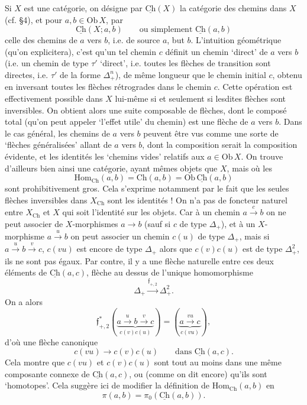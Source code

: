 \documentclass[11pt]{article}
\newcommand{\msp}[1]{\marginpar{\vspace*{10pt}\footnotesize [#1]}}
\newcommand{\Ch}{\underline{\mathrm{Ch}}}
\begin{document}
Si $X$ est une catégorie, on désigne par $\Ch(X)$ la catégorie des chemins dans $X$ (cf. §4), et pour $a,b \in \mathrm{Ob}\,X$, par
\[
\Ch(X;a,b) \qquad \text{ou simplement } \Ch(a,b)
\]
celle des chemins de $a$ vers $b$, i.e. de source $a$, but $b$. L'intuition géométrique (qu'on explicitera), c'est qu'un tel chemin $c$ définit un chemin `direct' de $a$ vers $b$ (i.e. un chemin de type $\tau'$ `direct', i.e. toutes les flèches de transition sont directes, i.e. $\tau'$ de la forme $\Delta_+^n$), de même longueur que le chemin initial $c$, obtenu en inversant toutes les flèches rétrogrades dans le chemin $c$. Cette opération est effectivement possible dans $X$ lui-même si et seulement si lesdites flèches sont inversibles. On obtient alors une suite composable de flèches, dont le composé total (qu'on peut appeler `l'effet utile' du chemin)
\msp{page 60}
est une flèche de $a$ vers $b$. Dans le cas général, les chemins de $a$ vers $b$ peuvent être vus comme une sorte de `flèches généralisées' allant de $a$ vers $b$, dont la composition serait la composition évidente, et les identités les `chemins vides' relatifs aux $a \in \mathrm{Ob}\,X$. On trouve d'ailleurs bien ainsi une catégorie, ayant mêmes objets que $X$, mais où les
\[
\mathrm{Hom}_{\mathrm{Ch}}(a,b) = \mathrm{Ch}(a,b) = \mathrm{Ob}\,\Ch(a,b)
\]
sont prohibitivement gros. Cela s'exprime notamment par le fait que les seules flèches inversibles dans $X_{\mathrm{Ch}}$ sont les identités ! On n'a pas de foncteur naturel entre $X_{\mathrm{Ch}}$ et $X$ qui soit l'identité sur les objets. Car à un chemin $a \xrightarrow{c} b$ on ne peut associer de $X$-morphismes $a \longrightarrow b$ (sauf si $c$ de type $\Delta_+$), et à un $X$-morphisme $a \xrightarrow{u} b$ on peut associer un chemin $c(u)$ de type $\Delta_+$, mais si $a \xrightarrow{u} b \xrightarrow{v} c$, $c(vu)$ est encore de type $\Delta_+$ alors que $c(v)c(u)$ est de type $\Delta_+^2$, ils ne sont pas égaux. Par contre, il y a une flèche naturelle entre ces deux éléments de $\Ch(a,c)$, flèche au dessus de l'unique homomorphisme
\[
\Delta_+ \xrightarrow{\mathfrak{f}_{+,2}} \Delta_+^2.
\]
\msp{page 61}
On a alors
\[
\mathfrak{f}_{+,2}^*(\underbrace{a \xrightarrow{u} b \xrightarrow{v} c}_{c(v)c(u)}) = (\underbrace{a \xrightarrow{vu} c}_{c(vu)}),
\]
d'où une flèche canonique
\[
c(vu) \longrightarrow c(v)c(u) \qquad \text{dans } \Ch(a,c).
\]
Cela montre que $c(vu)$ et $c(v)c(u)$ sont tout au moins dans une même composante connexe de $\Ch(a,c)$, ou (comme on dit encore) qu'ils sont `homotopes'. Cela suggère ici de modifier la définition de $\mathrm{Hom}_{\mathrm{Ch}}(a,b)$ en
\[
\pi(a,b) = \pi_0(\Ch(a,b)).
\]
\end{document}
